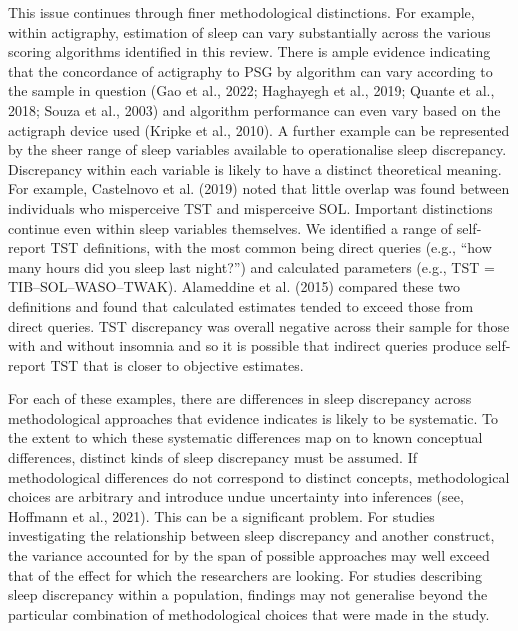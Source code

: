\documentclass[
]{article}
\begin{document}
This issue continues through finer methodological distinctions. For example, within actigraphy, estimation of sleep can vary substantially across the various scoring algorithms identified in this review. There is ample evidence indicating that the concordance of actigraphy to PSG by algorithm can vary according to the sample in question (Gao et al., 2022; Haghayegh et al., 2019; Quante et al., 2018; Souza et al., 2003) and algorithm performance can even vary based on the actigraph device used (Kripke et al., 2010). A further example can be represented by the sheer range of sleep variables available to operationalise sleep discrepancy. Discrepancy within each variable is likely to have a distinct theoretical meaning. For example, Castelnovo et al. (2019) noted that little overlap was found between individuals who misperceive TST and misperceive SOL. Important distinctions continue even within sleep variables themselves. We identified a range of self-report TST definitions, with the most common being direct queries (e.g., ``how many hours did you sleep last night?'') and calculated parameters (e.g., TST = TIB--SOL--WASO--TWAK). Alameddine et al. (2015) compared these two definitions and found that calculated estimates tended to exceed those from direct queries. TST discrepancy was overall negative across their sample for those with and without insomnia and so it is possible that indirect queries produce self-report TST that is closer to objective estimates.

For each of these examples, there are differences in sleep discrepancy across methodological approaches that evidence indicates is likely to be systematic. To the extent to which these systematic differences map on to known conceptual differences, distinct kinds of sleep discrepancy must be assumed. If methodological differences do not correspond to distinct concepts, methodological choices are arbitrary and introduce undue uncertainty into inferences (see, Hoffmann et al., 2021). This can be a significant problem. For studies investigating the relationship between sleep discrepancy and another construct, the variance accounted for by the span of possible approaches may well exceed that of the effect for which the researchers are looking. For studies describing sleep discrepancy within a population, findings may not generalise beyond the particular combination of methodological choices that were made in the study.
\end{document}

